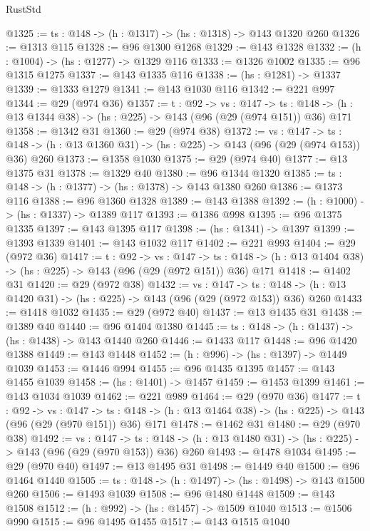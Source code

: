 \begin{lexlean}{RustStd}
\begin{coremodule}
@1325 := {ts : @148} -> (h : @1317) -> (hs : @1318) -> @143 @1320 @260
@1326 := @1313 @115
@1328 := @96 @1300 @1268
@1329 := @143 @1328
@1332 := (h : @1004) -> (hs : @1277) -> @1329 @116
@1333 := @1326 @1002
@1335 := @96 @1315 @1275
@1337 := @143 @1335 @116
@1338 := (hs : @1281) -> @1337
@1339 := @1333 @1279
@1341 := @143 @1030 @116
@1342 := @221 @997
@1344 := @29 (@974 @36)
@1357 := {t : @92} ->
  {vs : @147} ->
  {ts : @148} -> (h : @13 @1344 @38) -> (hs : @225) -> @143 (@96 (@29 (@974 @151)) @36) @171
@1358 := @1342 @31
@1360 := @29 (@974 @38)
@1372 := {vs : @147} ->
  {ts : @148} -> (h : @13 @1360 @31) -> (hs : @225) -> @143 (@96 (@29 (@974 @153)) @36) @260
@1373 := @1358 @1030
@1375 := @29 (@974 @40)
@1377 := @13 @1375 @31
@1378 := @1329 @40
@1380 := @96 @1344 @1320
@1385 := {ts : @148} -> (h : @1377) -> (hs : @1378) -> @143 @1380 @260
@1386 := @1373 @116
@1388 := @96 @1360 @1328
@1389 := @143 @1388
@1392 := (h : @1000) -> (hs : @1337) -> @1389 @117
@1393 := @1386 @998
@1395 := @96 @1375 @1335
@1397 := @143 @1395 @117
@1398 := (hs : @1341) -> @1397
@1399 := @1393 @1339
@1401 := @143 @1032 @117
@1402 := @221 @993
@1404 := @29 (@972 @36)
@1417 := {t : @92} ->
  {vs : @147} ->
  {ts : @148} -> (h : @13 @1404 @38) -> (hs : @225) -> @143 (@96 (@29 (@972 @151)) @36) @171
@1418 := @1402 @31
@1420 := @29 (@972 @38)
@1432 := {vs : @147} ->
  {ts : @148} -> (h : @13 @1420 @31) -> (hs : @225) -> @143 (@96 (@29 (@972 @153)) @36) @260
@1433 := @1418 @1032
@1435 := @29 (@972 @40)
@1437 := @13 @1435 @31
@1438 := @1389 @40
@1440 := @96 @1404 @1380
@1445 := {ts : @148} -> (h : @1437) -> (hs : @1438) -> @143 @1440 @260
@1446 := @1433 @117
@1448 := @96 @1420 @1388
@1449 := @143 @1448
@1452 := (h : @996) -> (hs : @1397) -> @1449 @1039
@1453 := @1446 @994
@1455 := @96 @1435 @1395
@1457 := @143 @1455 @1039
@1458 := (hs : @1401) -> @1457
@1459 := @1453 @1399
@1461 := @143 @1034 @1039
@1462 := @221 @989
@1464 := @29 (@970 @36)
@1477 := {t : @92} ->
  {vs : @147} ->
  {ts : @148} -> (h : @13 @1464 @38) -> (hs : @225) -> @143 (@96 (@29 (@970 @151)) @36) @171
@1478 := @1462 @31
@1480 := @29 (@970 @38)
@1492 := {vs : @147} ->
  {ts : @148} -> (h : @13 @1480 @31) -> (hs : @225) -> @143 (@96 (@29 (@970 @153)) @36) @260
@1493 := @1478 @1034
@1495 := @29 (@970 @40)
@1497 := @13 @1495 @31
@1498 := @1449 @40
@1500 := @96 @1464 @1440
@1505 := {ts : @148} -> (h : @1497) -> (hs : @1498) -> @143 @1500 @260
@1506 := @1493 @1039
@1508 := @96 @1480 @1448
@1509 := @143 @1508
@1512 := (h : @992) -> (hs : @1457) -> @1509 @1040
@1513 := @1506 @990
@1515 := @96 @1495 @1455
@1517 := @143 @1515 @1040

\end{coremodule}
\end{lexlean}
